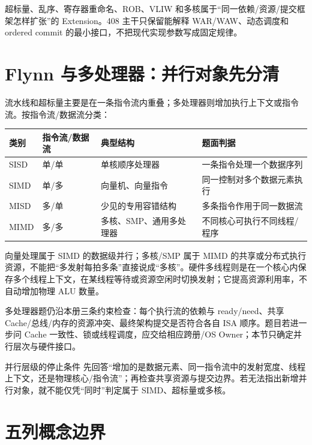 \documentclass[UTF8,fontset=fandol,11pt,a4paper]{ctexart}
\begin{document}
超标量、乱序、寄存器重命名、ROB、VLIW 和多核属于“同一依赖/资源/提交框架怎样扩张”的 Extension。408 主干只保留能解释 WAR/WAW、动态调度和 ordered commit 的最小接口，不把现代实现参数写成固定规律。

\section{Flynn 与多处理器：并行对象先分清}
流水线和超标量主要是在一条指令流内重叠；多处理器则增加执行上下文或指令流。按指令流/数据流分类：
\begin{center}\small
\begin{tabularx}{\linewidth}{L{2.0cm}L{2.2cm}YY}
\toprule
类别 & 指令流/数据流 & 典型结构 & 题面判据\\\midrule
SISD & 单/单 & 单核顺序处理器 & 一条指令处理一个数据序列\\
SIMD & 单/多 & 向量机、向量指令 & 同一控制对多个数据元素执行\\
MISD & 多/单 & 少见的专用容错结构 & 多条指令作用于同一数据流\\
MIMD & 多/多 & 多核、SMP、通用多处理器 & 不同核心可执行不同线程/程序\\
\bottomrule
\end{tabularx}\end{center}
向量处理属于 SIMD 的数据级并行；多核/SMP 属于 MIMD 的共享或分布式执行资源，不能把“多发射每拍多条”直接说成“多核”。硬件多线程则是在一个核心内保存多个线程上下文，在某线程等待或资源空闲时切换发射；它提高资源利用率，不自动增加物理 ALU 数量。

多处理器题仍沿本册三条约束检查：每个执行流的依赖与 ready/need、共享 Cache/总线/内存的资源冲突、最终架构提交是否符合各自 ISA 顺序。题目若进一步问 Cache 一致性、锁或线程调度，应交给相应跨册/OS Owner；本节只确定并行层次与硬件接口。

\begin{methodbox}{并行层级的停止条件}
先回答“增加的是数据元素、同一指令流中的发射宽度、线程上下文，还是物理核心/指令流”；再检查共享资源与提交边界。若无法指出新增并行对象，就不能仅凭“同时”判定属于 SIMD、超标量或多核。
\end{methodbox}

\section{五列概念边界}
\end{document}
